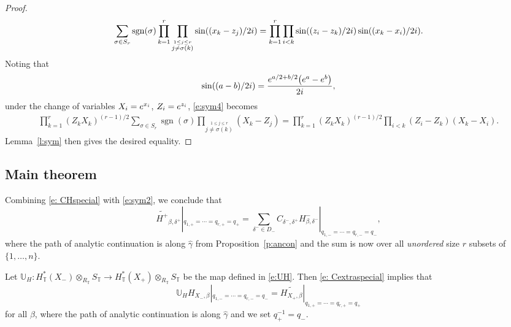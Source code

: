 \documentclass[11pt]{article}
\numberwithin{equation}{section}
\numberwithin{equation}{section}
\newcommand{\UU}{\mathbb{U}}
\newcommand{\torus}{\mathbb{T}}
\newcommand{\op}[1]{\operatorname{#1}}
\newcommand{\z}{z}
\newcommand{\x}{x}
\begin{document}
\begin{proof}
\begin{align}
\sum_{\sigma \in S_r} \op{sgn}(\sigma) \prod_{k=1}^r \prod_{\stackrel{1 \leq j \leq r}{j\neq {\sigma(k)}}} \sin( ( \x_{k}- \z_j)/2 {\rm i})
= \prod_{k=1}^r \prod_{i<k} \sin(( \z_{i}- \z_{k})/2 {\rm i}) \sin((\x_{k} - \x_{i})/2{\rm i}).
\label{e:sym4}
\end{align}
Noting that
\[
\sin((a-b)/2{\rm i}) = \frac{ {\rm e}^{a/2 + b/2}\bigl( {\rm e}^a - {\rm e}^b\bigr)}{2{\rm i}},
\]
under the change of variables $X_i = {\rm e}^{\x_i}$, $Z_i = {\rm e}^{\z_i}$, \eqref{e:sym4} becomes
\begin{align*}
\prod_{k=1}^r (Z_k X_k)^{(r-1)/2}\sum_{\sigma \in S_r} \op{sgn}(\sigma) \prod_{\stackrel{1 \leq j \leq r}{j\neq {\sigma(k)}}} (X_k - Z_j)
= \prod_{k=1}^r (Z_k X_k)^{(r-1)/2}\prod_{i<k} (Z_i - Z_k) (X_k - X_i).
\end{align*}
Lemma~\ref{l:sym} then gives the desired equality.
\end{proof}


\subsection{Main theorem}

Combining \eqref{e: CHspecial} with \eqref{e:sym2}, we conclude that
\begin{equation}\label{e: Cextraspecial} \widetilde{H^{+}}_{\beta, \delta^+}|_{q_{1, +} = \cdots =q_{r, +} = q_+} = \sum_{\delta^- \in D_-} C_{\delta^-, \delta^+} H^{-}_{\beta, \delta^-}|_{q_{1, -} = \cdots = q_{r, -} = q_-},\end{equation}
where the path of analytic continuation is along $\hat \gamma$ from Proposition~\ref{p:ancon} and the sum is now over all \emph{unordered} size $r$ subsets of $\{1, \dots, n\}$.

Let $\UU_H\colon H^*_\torus(X_{-})\otimes_{R_\torus} S_\torus \to H^*_\torus(X_{+})\otimes_{R_\torus} S_\torus$ be the map defined in \eqref{e:UH}.
Then \eqref{e: Cextraspecial} implies that
\begin{equation}\label{e:ms}\UU_H H_{X_{-}, \beta}|_{q_{1, -} = \cdots =q_{r, -} = q_-} = \widetilde{H_{X_{+}, \beta}}|_{q_{1, +} = \cdots =q_{r, +} = q_+} \end{equation}
for all $\beta$, where the path of analytic continuation is along $\hat \gamma$ and we set $q_+^{-1} = q_-$.
\end{document}
